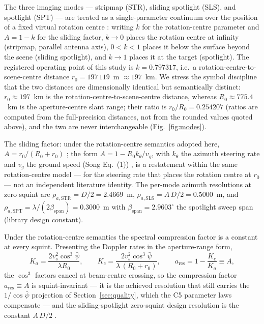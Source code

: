 \documentclass[preprint,authoryear]{elsarticle}
\begin{document}
The three imaging modes --- stripmap (STR), sliding spotlight (SLS), and spotlight (SPT) --- are treated as a single-parameter continuum over the position of a fixed virtual rotation centre \citep{kim2021optimal,zhang2018sliding,song2025spaceborne}: writing $k$ for the rotation-centre parameter and $A=1-k$ for the sliding factor, $k\to 0$ places the rotation centre at infinity (stripmap, parallel antenna axis), $0<k<1$ places it below the surface beyond the scene (sliding spotlight), and $k\to 1$ places it at the target (spotlight). The registered operating point of this study is $k=0.797317$, i.e.\ a rotation-centre-to-scene-centre distance $r_0=197\,119$~m $\approx 197$~km. We stress the symbol discipline that the two distances are dimensionally identical but semantically distinct: $r_0\approx 197$~km is the rotation-centre-to-scene-centre distance, whereas $R_0\approx 775.4$~km is the aperture-centre slant range; their ratio is $r_0/R_0=0.254207$ (ratios are computed from the full-precision distances, not from the rounded values quoted above), and the two are never interchangeable (Fig.~\ref{fig:modes}).

The sliding factor: under the rotation-centre semantics adopted here, $A=r_0/(R_0+r_0)$ \citep{zhang2018sliding}; the form $A=1-R_0 k_\theta/v_g$, with $k_\theta$ the azimuth steering rate and $v_g$ the ground speed (Song Eq.~(1)) \citep{song2025spaceborne}, is a restatement within the same rotation-centre model --- for the steering rate that places the rotation centre at $r_0$ --- not an independent literature identity. The per-mode azimuth resolutions at zero squint are $\rho_{a,\mathrm{STR}}=D/2=2.4669$~m, $\rho_{a,\mathrm{SLS}}=A\,D/2=0.5000$~m, and $\rho_{a,\mathrm{SPT}}=\lambda/(2\beta_{\mathrm{span}})=0.3000$~m with $\beta_{\mathrm{span}}=2.9603^{\circ}$ the spotlight sweep span (library design constant).

Under the rotation-centre semantics the spectral compression factor is a constant at every squint. Presenting the Doppler rates in the aperture-range form,
\[
K_a=\frac{2v_s^{2}\cos^{3}\bar\psi}{\lambda R_0},\qquad
K_c=\frac{2v_s^{2}\cos^{3}\bar\psi}{\lambda\,(R_0+r_0)},\qquad
a_{\mathrm{res}}=1-\frac{K_c}{K_a}\equiv A,
\]
the $\cos^3$ factors cancel at beam-centre crossing, so the compression factor $a_{\mathrm{res}}\equiv A$ is squint-invariant --- it is the achieved resolution that still carries the $1/\cos\bar\psi$ projection of Section~\ref{sec:quality}, which the C5 parameter laws compensate --- and the sliding-spotlight zero-squint design resolution is the constant $A\,D/2$ \citep{zhang2018sliding,song2025spaceborne}.
\end{document}
